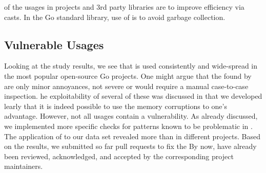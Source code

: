 \begin{tcolorbox}[boxsep=1pt, enlarge top by=5pt, title=Answer to \ref{rq:purpose}]
 of the \unsafe{} usages in projects and 3rd party libraries are to improve efficiency via \unsafe{} casts.
In the Go standard library,  use of \unsafe{} is to avoid garbage collection. 
\end{tcolorbox}


\subsection{Vulnerable Usages}
\label{sec:discussion}
Looking at the study results, we see that \unsafe{} is used consistently and wide-spread in the most popular open-source Go projects.
One might argue that the 
found by \toolUsage{} are only minor annoyances, not severe or would require a manual case-to-case inspection. 
he exploitability of several of these %
was discussed in  that we developed
learly  that it is indeed possible to use the memory corruptions to one's advantage.
However, not all \unsafe{} usages contain a vulnerability. 
As already discussed, we implemented more specific checks for  %
patterns known to be problematic in \toolSA{} .
The application of \toolSA{} to our data set revealed more than \numberBugsFixed{} 
in different projects.
Based on the results, we submitted so far \numberPRs{} pull requests to fix the 
By now, \numberPRsMerged{} have already been reviewed, acknowledged, and accepted by the corresponding project maintainers.